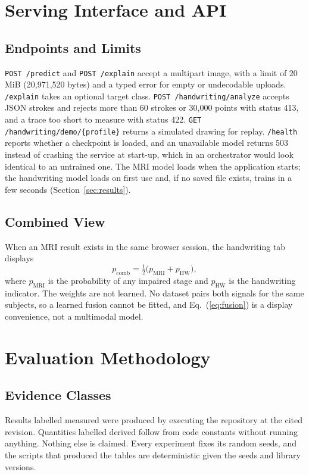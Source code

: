 \documentclass[conference]{IEEEtran}
\begin{document}
\section{Serving Interface and API}
\subsection{Endpoints and Limits}
\texttt{POST /predict} and \texttt{POST /explain} accept a multipart image, with a limit of 20 MiB (20,971,520 bytes) and a typed error for empty or undecodable uploads. \texttt{/explain} takes an optional target class. \texttt{POST /handwriting/analyze} accepts JSON strokes and rejects more than 60 strokes or 30,000 points with status 413, and a trace too short to measure with status 422. \texttt{GET /handwriting/demo/\{profile\}} returns a simulated drawing for replay. \texttt{/health} reports whether a checkpoint is loaded, and an unavailable model returns 503 instead of crashing the service at start-up, which in an orchestrator would look identical to an untrained one. The MRI model loads when the application starts; the handwriting model loads on first use and, if no saved file exists, trains in a few seconds (Section~\ref{sec:results}).

\subsection{Combined View}
\label{sec:fusion}
When an MRI result exists in the same browser session, the handwriting tab displays
\begin{equation}
p_{\mathrm{comb}} = \tfrac{1}{2}\big(p_{\mathrm{MRI}}+p_{\mathrm{HW}}\big),
\label{eq:fusion}
\end{equation}
where $p_{\mathrm{MRI}}$ is the probability of any impaired stage and $p_{\mathrm{HW}}$ is the handwriting indicator. The weights are not learned. No dataset pairs both signals for the same subjects, so a learned fusion cannot be fitted, and Eq.~(\ref{eq:fusion}) is a display convenience, not a multimodal model.

\section{Evaluation Methodology}
\label{sec:method}
\subsection{Evidence Classes}
Results labelled measured were produced by executing the repository at the cited revision. Quantities labelled derived follow from code constants without running anything. Nothing else is claimed. Every experiment fixes its random seeds, and the scripts that produced the tables are deterministic given the seeds and library versions.
\end{document}
